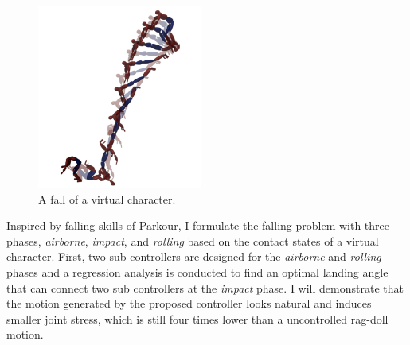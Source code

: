 \begin{figure}
 \vspace{-25pt}
  \begin{center}
    \includegraphics[width=0.48\textwidth]{images/intro_falling_sequence.png}
  \end{center}
   \vspace{-25pt}
  \caption{A fall of a virtual character.}
  \label{fig:intro_landing}
   \vspace{-10pt}
\end{figure}

Inspired by falling skills of Parkour, 
I formulate the falling problem
with three phases, \emph{airborne}, \emph{impact}, and \emph{rolling}
based on the contact states of a virtual character.
First, two sub-controllers are designed for the \emph{airborne} and
\emph{rolling} phases and a regression analysis is conducted to find 
an optimal landing angle that can connect two sub controllers at the
\emph{impact} phase.
I will demonstrate that the motion generated by the proposed controller
looks natural and induces smaller joint stress, which is still four times lower
than a uncontrolled rag-doll motion.



